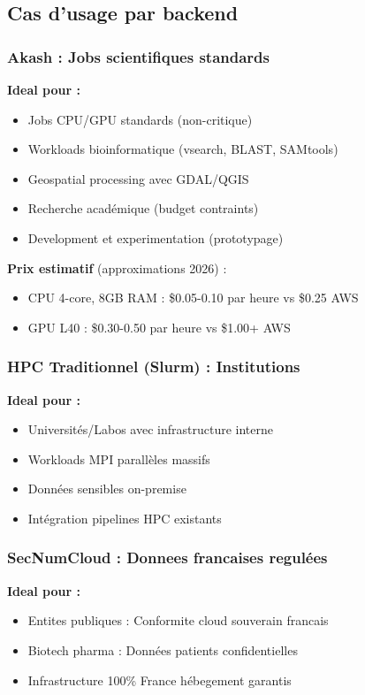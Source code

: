 \documentclass[11pt,a4paper]{article}
\begin{document}
	\subsection{Cas d'usage par backend}
	
	\subsubsection{Akash : Jobs scientifiques standards}
	
	\textbf{Ideal pour :}
	\begin{itemize}
		\item Jobs CPU/GPU standards (non-critique)
		\item Workloads bioinformatique (vsearch, BLAST, SAMtools)
		\item Geospatial processing avec GDAL/QGIS
		\item Recherche académique (budget contraints)
		\item Development et experimentation (prototypage)
	\end{itemize}
	
	\textbf{Prix estimatif} (approximations 2026) :
	\begin{itemize}
		\item CPU 4-core, 8GB RAM : \$0.05-0.10 par heure vs \$0.25 AWS
		\item GPU L40 : \$0.30-0.50 par heure vs \$1.00+ AWS
	\end{itemize}
	
	
	\subsubsection{HPC Traditionnel (Slurm) : Institutions}
	
	\textbf{Ideal pour :}
	\begin{itemize}
		\item Universités/Labos avec infrastructure interne
		\item Workloads MPI parallèles massifs
		\item Données sensibles on-premise
		\item Intégration pipelines HPC existants
	\end{itemize}
	
	\subsubsection{SecNumCloud : Donnees francaises regulées}
	
	\textbf{Ideal pour :}
	\begin{itemize}
		\item Entites publiques : Conformite cloud souverain francais
		\item Biotech pharma : Données patients confidentielles
		\item Infrastructure 100\% France hébegement garantis
	\end{itemize}
	
\end{document}
